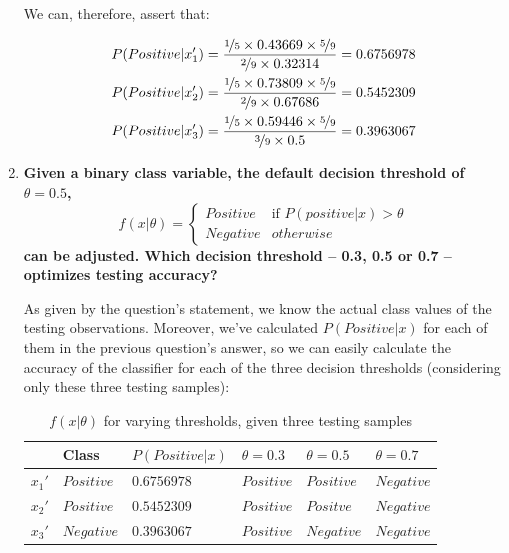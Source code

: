 \documentclass[12pt]{article}
\begin{document}
\begin{enumerate}[leftmargin=\labelsep]
\begin{multicols}{3}
  \end{multicols}

  We can, therefore, assert that:

  \begin{align*}
    P(Positive | x_1') &= \frac{\nicefrac{1}{5} \times 0.43669 \times \nicefrac{5}{9}}{\nicefrac{2}{9} \times 0.32314} = 0.6756978 \\
    P(Positive | x_2') &= \frac{\nicefrac{1}{5} \times 0.73809 \times \nicefrac{5}{9}}{\nicefrac{2}{9} \times 0.67686} = 0.5452309 \\
    P(Positive | x_3') &= \frac{\nicefrac{1}{5} \times 0.59446 \times \nicefrac{5}{9}}{\nicefrac{3}{9} \times 0.5} = 0.3963067
  \end{align*}

  \pagebreak

  \item \textbf{Given a binary class variable, the default decision threshold of $\theta = 0.5$,
    $$
    f(x | \theta) = \begin{cases}
      Positive & \text{if } P(positive | x) > \theta \\
      Negative & otherwise
    \end{cases}
    $$
    can be adjusted. Which decision threshold – 0.3, 0.5 or 0.7 – optimizes testing accuracy?
  }

  As given by the question's statement, we know the actual class values of the testing observations.
  Moreover, we've calculated $P(Positive | x)$ for each of them in the previous question's answer,
  so we can easily calculate the accuracy of the classifier for each of the three decision thresholds
  (considering only these three testing samples):

  \begin{table}[h]
    \centering
    \begin{tabular}{l|l|l|l|l|l}
    \hline
           & Class      & $P(Positive | x)$ & $\theta = 0.3$ & $\theta = 0.5$ & $\theta = 0.7$ \\ \hline
    $x_1'$ & $Positive$ & $0.6756978$           & $Positive$     & $Positive$     & $Negative$     \\ \hline
    $x_2'$ & $Positive$ & $0.5452309$           & $Positive$     & $Positve$     & $Negative$     \\ \hline
    $x_3'$ & $Negative$ & $0.3963067$         & $Positive$     & $Negative$     & $Negative$     \\ \hline
    \end{tabular}
    \caption{$f(x | \theta)$ for varying thresholds, given three testing samples}
    \label{tab:thresholds}
  \end{table}


\end{enumerate}
\end{document}
